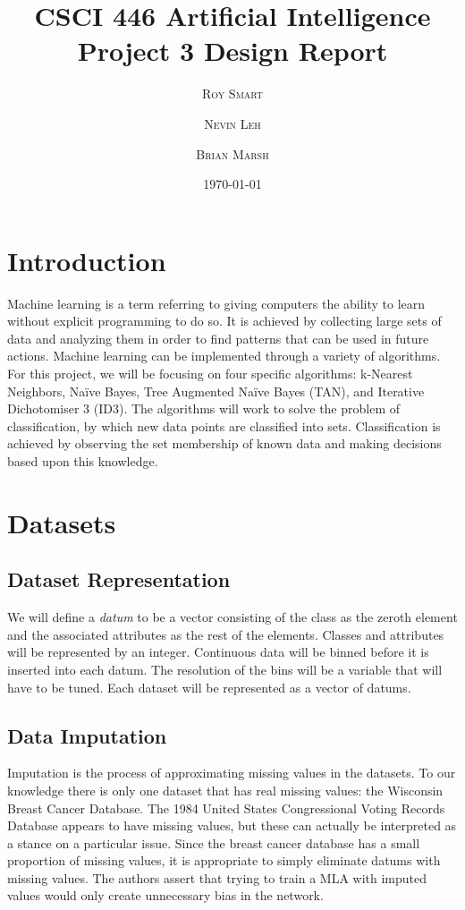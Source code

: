 \documentclass{article}
\title{\vspace{-15mm}\fontsize{24pt}{10pt}\selectfont\textbf{CSCI 446 Artificial Intelligence \\[2mm] Project 3 Design Report} } %
\date{\today}
\author{
\large
\textsc{Roy Smart} \and \textsc{Nevin Leh} \and \textsc{Brian Marsh}\\[2mm] %
}
\begin{document}
	\maketitle %
	\thispagestyle{fancy} %
	\normalsize

	\section{Introduction}
		Machine learning is a term referring to giving computers the ability to learn without explicit programming to do so.  
		It is achieved by collecting large sets of data and analyzing them in order to find patterns that can be used in future actions.  
		Machine learning can be implemented through a variety of algorithms.  
		For this project, we will be focusing on four specific algorithms: k-Nearest Neighbors, Naïve Bayes, Tree Augmented Naïve Bayes (TAN), and Iterative Dichotomiser 3 (ID3).  
		The algorithms will work to solve the problem of classification, by which new data points are classified into sets.  
		Classification is achieved by observing the set membership of known data and making decisions based upon this knowledge.
	\section{Datasets}
		\subsection{Dataset Representation}
			We will define a \textit{datum} to be a vector consisting of the class as the zeroth element and the associated attributes as the rest of the elements. Classes and attributes will be represented by an integer. Continuous data will be binned before it is inserted into each datum. The resolution of the bins will be a variable that will have to be tuned. Each dataset will be represented as a vector of datums.
		\subsection{Data Imputation}
			Imputation is the process of approximating missing values in the datasets. 
			To our knowledge there is only one dataset that has real missing values: the Wisconsin Breast Cancer Database. 
			The 1984 United States Congressional Voting Records Database appears to have missing values, but these can actually be interpreted as a stance on a particular issue. 
			Since the breast cancer database has a small proportion of missing values, it is appropriate to simply eliminate datums with missing values. 
			The authors assert that trying to train a MLA with imputed values would only create unnecessary bias in the network.
			
\end{document}
